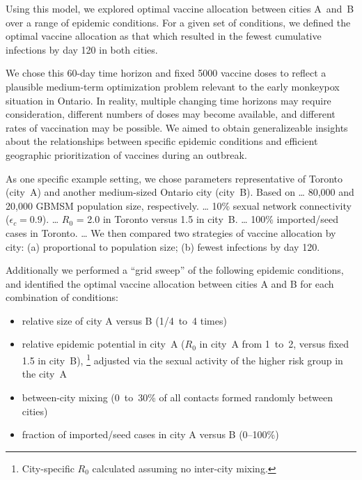 Using this model, we explored optimal vaccine allocation between cities A~and~B
over a range of epidemic conditions.
For a given set of conditions, we defined the optimal vaccine allocation as that which
resulted in the fewest cumulative infections by day 120 in both cities.
\par
We chose this 60-day time horizon and fixed 5000 vaccine doses to reflect
a plausible medium-term optimization problem relevant to the early monkeypox situation in Ontario.
In reality, multiple changing time horizons may require consideration,
different numbers of doses may become available, and
different rates of vaccination may be possible.
We aimed to obtain generalizeable insights about the relationships between
specific epidemic conditions and efficient geographic prioritization of vaccines during an outbreak.
\par
As one specific example setting, we chose parameters representative of
Toronto (city~A) and another medium-sized Ontario city (city~B).
Based on 
\dots
80,000 and 20,000 GBMSM population size, respectively.
\dots
10\% sexual network connectivity ($\epsilon_c = 0.9$).
\dots
$R_0$ = 2.0 in Toronto versus 1.5 in city~B.
\dots
100\% imported/seed cases in Toronto.
\dots
We then compared two strategies of vaccine allocation by city:
(a) proportional to population size;
(b) fewest infections by day 120.
\par
Additionally we performed a ``grid sweep'' of the following epidemic conditions,
and identified the optimal vaccine allocation between cities A and B for each combination of conditions:
\begin{itemize}
  \item relative size of city A versus B (1/4~to~4 times)
  \item relative epidemic potential in city~A ($R_0$ in city~A from 1~to~2, versus fixed 1.5 in city~B),%
  \footnote{City-specific $R_0$ calculated assuming no inter-city mixing.}
        adjusted via the sexual activity of the higher risk group in the city~A
  \item between-city mixing (0~to~30\% of all contacts formed randomly between cities)
  \item fraction of imported/seed cases in city A versus B (0--100\%)
\end{itemize}



